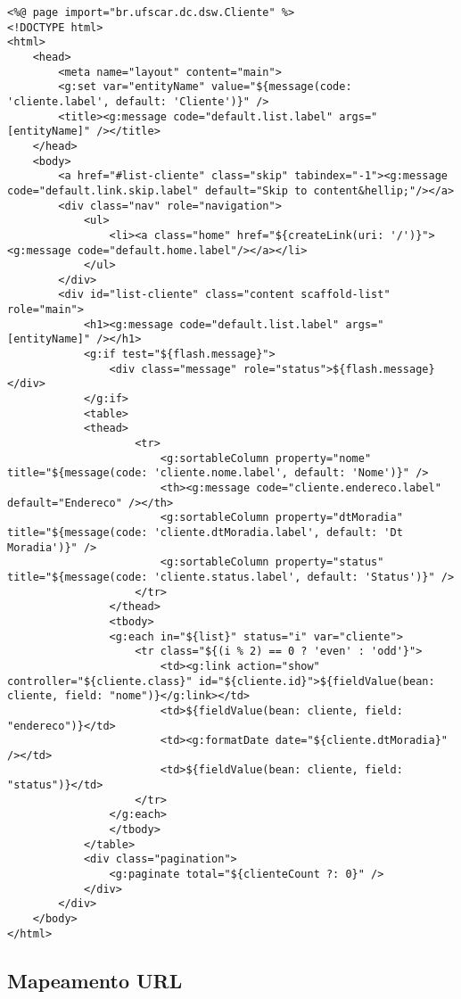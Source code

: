 \begin{lstlisting}[caption=Visão       {\bf       cliente/index.gsp},      frame
    =trBL,float=htbp, label=codCliIndex] 
<%@ page import="br.ufscar.dc.dsw.Cliente" %>
<!DOCTYPE html>
<html>
	<head>
		<meta name="layout" content="main">
		<g:set var="entityName" value="${message(code: 'cliente.label', default: 'Cliente')}" />
		<title><g:message code="default.list.label" args="[entityName]" /></title>
	</head>
	<body>
		<a href="#list-cliente" class="skip" tabindex="-1"><g:message code="default.link.skip.label" default="Skip to content&hellip;"/></a>
		<div class="nav" role="navigation">
			<ul>
				<li><a class="home" href="${createLink(uri: '/')}"><g:message code="default.home.label"/></a></li>
			</ul>
		</div>
		<div id="list-cliente" class="content scaffold-list" role="main">
			<h1><g:message code="default.list.label" args="[entityName]" /></h1>
			<g:if test="${flash.message}">
				<div class="message" role="status">${flash.message}</div>
			</g:if>
			<table>
			<thead>
					<tr>
						<g:sortableColumn property="nome" title="${message(code: 'cliente.nome.label', default: 'Nome')}" />
						<th><g:message code="cliente.endereco.label" default="Endereco" /></th>
						<g:sortableColumn property="dtMoradia" title="${message(code: 'cliente.dtMoradia.label', default: 'Dt Moradia')}" />
						<g:sortableColumn property="status" title="${message(code: 'cliente.status.label', default: 'Status')}" />
					</tr>
				</thead>
				<tbody>
				<g:each in="${list}" status="i" var="cliente">
					<tr class="${(i % 2) == 0 ? 'even' : 'odd'}">
						<td><g:link action="show" controller="${cliente.class}" id="${cliente.id}">${fieldValue(bean: cliente, field: "nome")}</g:link></td>
						<td>${fieldValue(bean: cliente, field: "endereco")}</td>
						<td><g:formatDate date="${cliente.dtMoradia}" /></td>
						<td>${fieldValue(bean: cliente, field: "status")}</td>
					</tr>
				</g:each>
				</tbody>
			</table>
			<div class="pagination">
				<g:paginate total="${clienteCount ?: 0}" />
			</div>
		</div>
	</body>
</html>
\end{lstlisting}

\subsection{Mapeamento URL}

\vspace{0.3cm}


